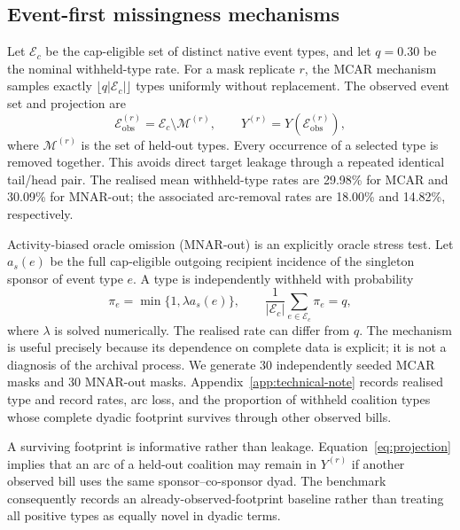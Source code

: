 \documentclass{nws}
\begin{document}
\subsection{Event-first missingness mechanisms}\label{sec:masking}

Let $\mathcal{E}_{c}$ be the cap-eligible set of distinct native event types, and let $q=0.30$ be the nominal withheld-type rate. For a mask replicate $r$, the MCAR mechanism samples exactly $\lfloor q|\mathcal{E}_{c}|\rfloor$ types uniformly without replacement. The observed event set and projection are
\begin{equation}
 \mathcal{E}^{(r)}_{\mathrm{obs}}=\mathcal{E}_{c}\setminus\mathcal{M}^{(r)},
 \qquad Y^{(r)}=Y\!\left(\mathcal{E}^{(r)}_{\mathrm{obs}}\right),
 \label{eq:event-mask}
\end{equation}
where $\mathcal{M}^{(r)}$ is the set of held-out types. Every occurrence of a selected type is removed together. This avoids direct target leakage through a repeated identical tail/head pair. The realised mean withheld-type rates are 29.98\% for MCAR and 30.09\% for MNAR-out; the associated arc-removal rates are 18.00\% and 14.82\%, respectively.

Activity-biased oracle omission (MNAR-out) is an explicitly oracle stress test. Let $a_s(e)$ be the full cap-eligible outgoing recipient incidence of the singleton sponsor of event type $e$. A type is independently withheld with probability
\begin{equation}
 \pi_e=\min\{1,\lambda a_s(e)\},
 \qquad \frac{1}{|\mathcal{E}_c|}\sum_{e\in\mathcal{E}_c}\pi_e=q,
 \label{eq:mnar}
\end{equation}
where $\lambda$ is solved numerically. The realised rate can differ from $q$. The mechanism is useful precisely because its dependence on complete data is explicit; it is not a diagnosis of the archival process. We generate 30 independently seeded MCAR masks and 30 MNAR-out masks. Appendix~\ref{app:technical-note} records realised type and record rates, arc loss, and the proportion of withheld coalition types whose complete dyadic footprint survives through other observed bills.

A surviving footprint is informative rather than leakage. Equation~\eqref{eq:projection} implies that an arc of a held-out coalition may remain in $Y^{(r)}$ if another observed bill uses the same sponsor--co-sponsor dyad. The benchmark consequently records an already-observed-footprint baseline rather than treating all positive types as equally novel in dyadic terms.
\end{document}
